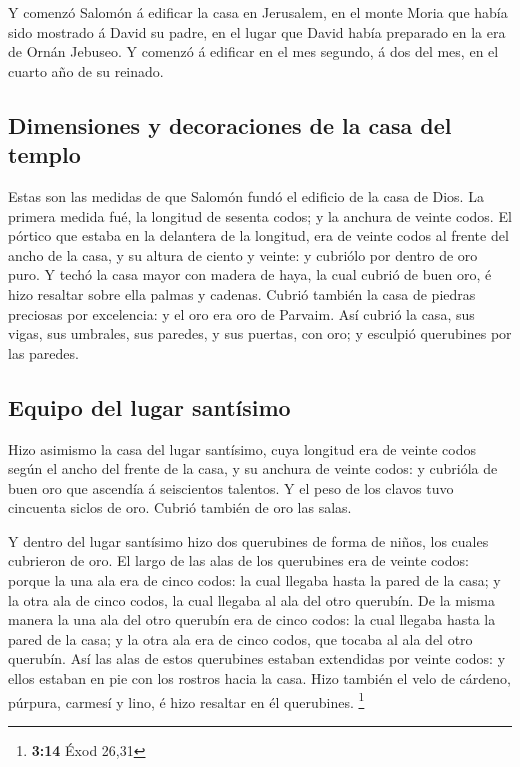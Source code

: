  Y comenzó Salomón á edificar la casa en Jerusalem, en el
monte Moria que había sido mostrado á David su padre, en el lugar que
David había preparado en la era de Ornán Jebuseo.  Y
comenzó á edificar en el mes segundo, á dos del mes, en el cuarto año de
su reinado.

\hypertarget{dimensiones-y-decoraciones-de-la-casa-del-templo}{%
\subsection{Dimensiones y decoraciones de la casa del
templo}\label{dimensiones-y-decoraciones-de-la-casa-del-templo}}

 Estas son las medidas de que Salomón fundó el edificio de
la casa de Dios. La primera medida fué, la longitud de sesenta codos; y
la anchura de veinte codos.  El pórtico que estaba en la
delantera de la longitud, era de veinte codos al frente del ancho de la
casa, y su altura de ciento y veinte: y cubriólo por dentro de oro puro.
 Y techó la casa mayor con madera de haya, la cual cubrió
de buen oro, é hizo resaltar sobre ella palmas y cadenas. 
Cubrió también la casa de piedras preciosas por excelencia: y el oro era
oro de Parvaim.  Así cubrió la casa, sus vigas, sus
umbrales, sus paredes, y sus puertas, con oro; y esculpió querubines por
las paredes.

\hypertarget{equipo-del-lugar-santuxedsimo}{%
\subsection{Equipo del lugar
santísimo}\label{equipo-del-lugar-santuxedsimo}}

 Hizo asimismo la casa del lugar santísimo, cuya longitud
era de veinte codos según el ancho del frente de la casa, y su anchura
de veinte codos: y cubrióla de buen oro que ascendía á seiscientos
talentos.  Y el peso de los clavos tuvo cincuenta siclos
de oro. Cubrió también de oro las salas.

 Y dentro del lugar santísimo hizo dos querubines de
forma de niños, los cuales cubrieron de oro.  El largo de
las alas de los querubines era de veinte codos: porque la una ala era de
cinco codos: la cual llegaba hasta la pared de la casa; y la otra ala de
cinco codos, la cual llegaba al ala del otro querubín. 
De la misma manera la una ala del otro querubín era de cinco codos: la
cual llegaba hasta la pared de la casa; y la otra ala era de cinco
codos, que tocaba al ala del otro querubín.  Así las alas
de estos querubines estaban extendidas por veinte codos: y ellos estaban
en pie con los rostros hacia la casa.  Hizo también el
velo de cárdeno, púrpura, carmesí y lino, é hizo resaltar en él
querubines. \footnote{\textbf{3:14} Éxod 26,31}

